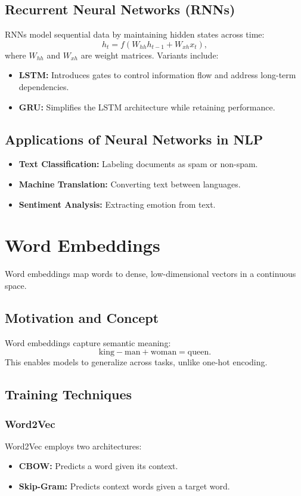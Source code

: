 \documentclass[12pt]{article}
\begin{document}
\subsection{Recurrent Neural Networks (RNNs)}
RNNs model sequential data by maintaining hidden states across time:
\[
h_t = f(W_{hh} h_{t-1} + W_{xh} x_t),
\]
where \(W_{hh}\) and \(W_{xh}\) are weight matrices. Variants include:
\begin{itemize}
    \item \textbf{LSTM:} Introduces gates to control information flow and address long-term dependencies.
    \item \textbf{GRU:} Simplifies the LSTM architecture while retaining performance.
\end{itemize}

\subsection{Applications of Neural Networks in NLP}
\begin{itemize}
    \item \textbf{Text Classification:} Labeling documents as spam or non-spam.
    \item \textbf{Machine Translation:} Converting text between languages.
    \item \textbf{Sentiment Analysis:} Extracting emotion from text.
\end{itemize}

\section{Word Embeddings}
Word embeddings map words to dense, low-dimensional vectors in a continuous space.

\subsection{Motivation and Concept}
Word embeddings capture semantic meaning:
\[
\text{king} - \text{man} + \text{woman} = \text{queen}.
\]
This enables models to generalize across tasks, unlike one-hot encoding.

\subsection{Training Techniques}
\subsubsection{Word2Vec}
Word2Vec employs two architectures:
\begin{itemize}
    \item \textbf{CBOW:} Predicts a word given its context.
    \item \textbf{Skip-Gram:} Predicts context words given a target word.
\end{itemize}
\end{document}
